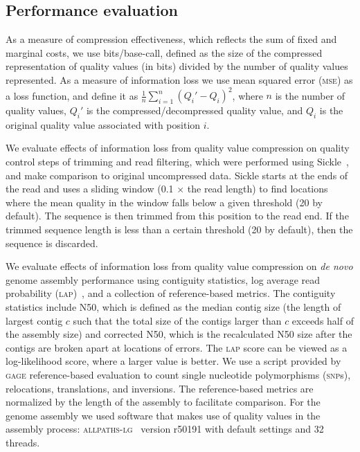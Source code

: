 \documentclass{bmcart}
\begin{document}
\subsection*{Performance evaluation}

As a measure of compression effectiveness, which reflects the sum of
fixed and marginal costs, we use bits/base-call, defined as the size
of the compressed representation of quality values (in bits) divided
by the number of quality values represented. As a measure of
information loss we use mean squared error (\textsc{mse}) as a loss
function, and define it as $\frac{1}{n}\sum_{i=1}^{n}{(Q_i'-Q_i)^2}$,
where $n$ is the number of quality values, $Q_i'$ is the
compressed/decompressed quality value, and $Q_i$ is the original
quality value associated with position $i$.

We evaluate effects of information loss from quality value compression
on quality control steps of trimming and read filtering, which were
performed using Sickle~\cite{sickle}, and make comparison to original
uncompressed data. Sickle starts at the ends of the read and uses a
sliding window (0.1 $\times$ the read length) to find locations where
the mean quality in the window falls below a given threshold (20 by
default). The sequence is then trimmed from this position to the read
end. If the trimmed sequence length is less than a certain threshold
(20 by default), then the sequence is discarded.

We evaluate effects of information loss from quality value compression
on \emph{de novo} genome assembly performance using contiguity
statistics, log average read probability
(\textsc{lap})~\cite{Ghodsi:2013hb}, and a collection of
reference-based metrics. The contiguity statistics include N50, which
is defined as the median contig size (the length of largest contig $c$
such that the total size of the contigs larger than $c$ exceeds half
of the assembly size) and corrected N50, which is the recalculated N50
size after the contigs are broken apart at locations of errors. The
\textsc{lap} score can be viewed as a log-likelihood score, where a
larger value is better. We use a script provided by \textsc{gage}
reference-based evaluation to count single nucleotide polymorphisms
(\textsc{snp}s), relocations, translations, and inversions. The
reference-based metrics are normalized by the length of the assembly
to facilitate comparison. For the genome assembly we used software
that makes use of quality values in the assembly process:
\textsc{allpaths-lg}~\cite{Gnerre:2011kx} version r50191 with default
settings and 32 threads.
\end{document}
